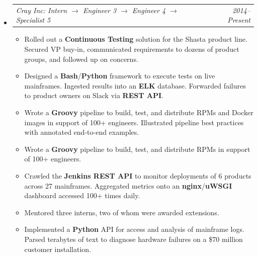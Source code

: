 \documentclass[12pt,letterpaper]{article}
\makeatletter
\newcommand{\headerpair}[2]{
    \begin{tabular*}{\linewidth}{l@{ \extracolsep{\fill} }r} {\large\emph{#1}} & {\large\emph{#2}}
    \end{tabular*}
}
\newcommand{\headerrow}[3]{\headerpair{#2: #1}{#3}}
\makeatother
\begin{document}
\begin{itemize}[leftmargin=\parindent]
    \item[]
        \headerrow
            {Intern $\to$ Engineer 3 $\to$ Engineer 4 $\to$ Specialist 5}
            {Cray Inc}
            {2014--Present}
        \begin{itemize}[leftmargin=\parindent]

            \item Rolled out a \textbf{Continuous Testing} solution for the Shasta product line. Secured VP buy-in, communicated requirements to dozens of product groups, and followed up on concerns.

            \item Designed a \textbf{Bash}/\textbf{Python} framework to execute tests on live mainframes. Ingested results into an \textbf{ELK} database. Forwarded failures to product owners on Slack via \textbf{REST API}.

            \item Wrote a \textbf{Groovy} pipeline to build, test, and distribute RPMs and Docker images in support of 100+ engineers. Illustrated pipeline best practices with annotated end-to-end examples.

            \item Wrote a \textbf{Groovy} pipeline to build, test, and distribute RPMs in support of 100+ engineers.

            \item Crawled the \textbf{Jenkins REST API} to monitor deployments of 6 products across 27 mainframes. Aggregated metrics onto an \textbf{nginx}/\textbf{uWSGI} dashboard accessed 100+ times daily.

            \item Mentored three interns, two of whom were awarded extensions.

            \item Implemented a \textbf{Python} API for access and analysis of mainframe logs. Parsed terabytes of text to diagnose hardware failures on a \$70 million customer installation.





\end{itemize}
\end{itemize}
\end{document}
